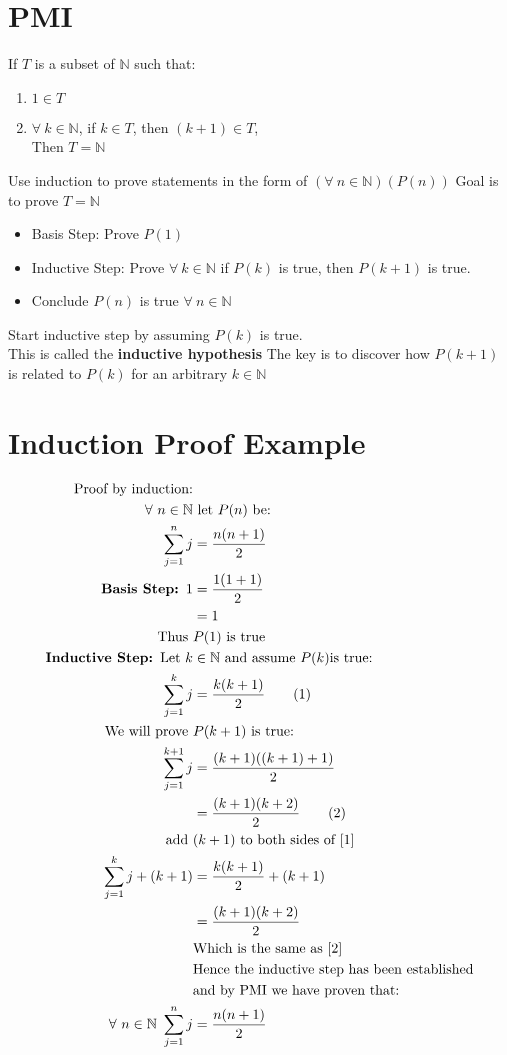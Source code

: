 \documentclass{article}
\begin{document}
\begin{flushleft}
\section{PMI}
If $T$ is a subset of $\mathbb{N}$ such that:
\begin{enumerate}
\item $1\in T$
\item $\forall \ k \in \mathbb{N}$, if $k\in T$, then
$(k+1)\in T$, \\
Then $T=\mathbb{N}$
\end{enumerate}
Use induction to prove statements in the form of 
$(\forall \ n \in \mathbb{N})(P(n))$\medbreak
Goal is to prove $T = \mathbb{N}$ \medbreak
\begin{itemize}
\item Basis Step: Prove $P(1)$
\item Inductive Step: Prove $\forall \ k\in \mathbb{N}$ if
$P(k)$ is true, then $P(k+1)$ is true.
\item Conclude $P(n)$ is true $\forall \ n \in \mathbb{N}$
\end{itemize}
Start inductive step by assuming $P(k)$ is true.\\
This is called the \textbf{inductive hypothesis}\medbreak
The key is to discover how $P(k+1)$ is related to $P(k)$ for an arbitrary $k\in \mathbb{N}$
\section{Induction Proof Example}

\begin{align*}
\text{Proof by induction:}&\\
\forall \ n \in \mathbb{N} &\text{ let } P(n) \text{ be:}\\
\sum_{j=1}^{n}j&=\dfrac{n(n+1)}{2}\\
\textbf{Basis Step: } 1&=\dfrac{1(1+1)}{2}\\
&= 1\\
\text{Thus } &P(1) \text{ is true}\\
\textbf{Inductive Step: } \text{Let } k&\in \mathbb{N} \text{ and assume }
P(k) \text{is true:}\\
\sum_{j=1}^{k}j&=\dfrac{k(k+1)}{2} \label{1}\tag{1}\\
\text{We will prove } &P(k+1) \text{ is true:}\\
\sum_{j=1}^{k+1}j&=\dfrac{(k+1)((k+1)+1)}{2}\\
&=\dfrac{(k+1)(k+2)}{2}\label{2}\tag{2}\\
\text{add } &(k+1) \text{ to both sides of } \eqref{1}\\
\sum_{j=1}^{k}j +(k+1)&=\dfrac{k(k+1)}{2}+(k+1)\\
&=\dfrac{(k+1)(k+2)}{2}\\
&\text{Which is the same as } \eqref{2}\\
&\text{Hence the inductive step has been established}\\
 &\text{and by PMI we have proven that:}\\
\forall \ n \in \mathbb{N} \ \sum_{j=1}^{n}j&=\frac{n(n+1)}{2}
\end{align*}




\end{flushleft}
\end{document}
